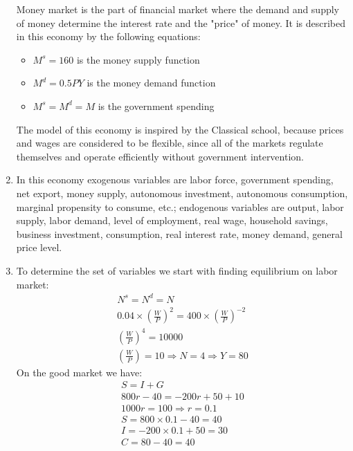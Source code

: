 \documentclass[a4paper,12pt]{article} %
\begin{document}
\begin{enumerate}[label=\alph*)]
 
 Money market is  the part of financial market where the demand and supply of money determine the interest rate and the "price" of money. It is described in this economy by the following equations: 
 
 
  \begin{itemize}
 	\item $ M^{s} =  160 $ is  the money supply function
 	\item $ M^{d} = 0.5PY $ is the money demand function
 	\item $  M^{s} = M^{d} = M $ is  the government spending 
 \end{itemize}
 


The model of this economy is inspired by the Classical school, because prices and wages are considered to be flexible, since all of the markets regulate themselves and operate efficiently without government intervention.

\item  In this economy exogenous variables are labor force, government spending, net export, money supply, autonomous investment, autonomous consumption, marginal propensity to consume, etc.; endogenous variables are output, labor supply, labor demand,  level of employment, real wage, household savings, business investment, consumption, real interest rate, money demand, general price level.

\item  To determine the set of variables we start with finding equilibrium on labor market: 
\begin{gather*}
  N^{s} = N^{d} = N  \\
0.04 \times \left( \frac{W}{P}\right) ^{2}  = 400 \times \left( \frac{W}{P}\right) ^{-2}  \\
\left( \frac{W}{P}\right) ^{4} = 10000  \\
 \left( \frac{W}{P}\right) = 10 \Rightarrow N=4 \Rightarrow Y=80
\end{gather*}
On the good market we have: 
\begin{gather*}
S=I+G\\
 800r -40 =  -200r + 50 + 10  \\
  1000r=100  \Rightarrow  r=0.1\\
  S = 800 \times 0.1 - 40 = 40 \\
  I = -200 \times 0.1 + 50 = 30 \\
  C = 80 - 40 = 40 
\end{gather*}


\end{enumerate}
\end{document}
